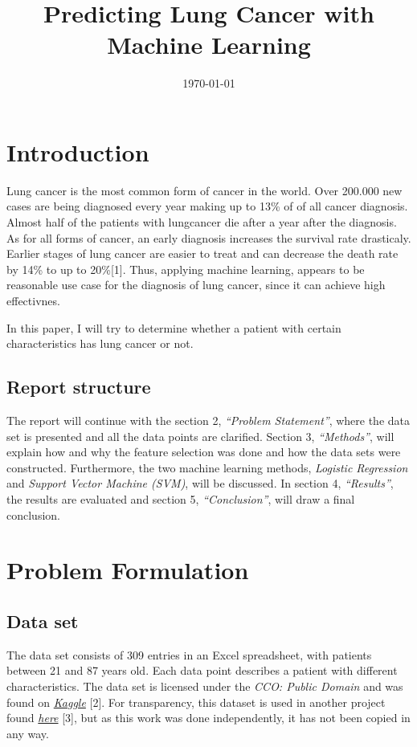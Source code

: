 \documentclass[a4paper,12pt]{article}
\date{\today}
\title{Predicting Lung Cancer with Machine Learning}
\begin{document}
\maketitle
\section{Introduction}
\label{sec:orgb8c9554}
Lung cancer is the most common form of cancer in the world. Over 200.000 new cases are being diagnosed every year making up to 13\% of of all cancer diagnosis. Almost half of the patients with lungcancer die after a year after the diagnosis.
As for all forms of cancer, an early diagnosis increases the survival rate drasticaly. Earlier stages of lung cancer are easier to treat and can decrease the death rate by 14\% to up to 20\%[1].
Thus, applying machine learning, appears to be reasonable use case for the diagnosis of lung cancer, since it can achieve high effectivnes.

In this paper, I will try to determine whether a patient with certain characteristics has lung cancer or not.

\subsection{Report structure}
\label{sec:orgdee0839}
The report will continue with the section 2, \emph{``Problem Statement''}, where the data set is presented and all the data points are clarified.
Section 3, \emph{``Methods''}, will explain how and why the feature selection was done and how the data sets were constructed.
Furthermore, the two machine learning methods, \emph{Logistic Regression} and \emph{Support Vector Machine (SVM)}, will be discussed.
In section 4, \emph{``Results''}, the results are evaluated and section 5, \emph{``Conclusion''}, will draw a final conclusion.

\section{Problem Formulation}
\label{sec:org53b4269}

\subsection{Data set}
\label{sec:orgfb27c00}
The data set consists of 309 entries in an Excel spreadsheet, with patients between 21 and 87 years old.
Each data point describes a patient with different characteristics.
The data set is licensed under the \emph{CCO: Public Domain} and was found on \emph{\href{https://www.kaggle.com/datasets/mysarahmadbhat/lung-cancer}{Kaggle}} [2].
For transparency, this dataset is used in another project found \emph{\href{https://www.kaggle.com/code/gaganmaahi224/lung-cancer-5ml-models-full-analysis-plotly}{here}} [3], but as this work was done independently, it has not been copied in any way.
\end{document}

